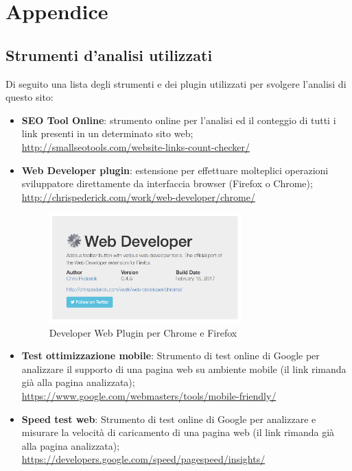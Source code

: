 \documentclass[../Relazione.tex]{subfiles}
\begin{document}
	
	\section{Appendice}

		\subsection{Strumenti d'analisi utilizzati}
		Di seguito una lista degli strumenti e dei plugin utilizzati per svolgere l'analisi di questo sito:

		\begin{itemize}
			\item \textbf{SEO Tool Online}: strumento online per l'analisi ed il conteggio di tutti i link presenti in un determinato sito web;\\
			\href{http://smallseotools.com/website-links-count-checker/}{http://smallseotools.com/website-links-count-checker/}
			\item \textbf{Web Developer plugin}: estensione per effettuare molteplici operazioni sviluppatore direttamente da interfaccia browser (Firefox o Chrome);\\
			\href{http://chrispederick.com/work/web-developer/chrome/}{http://chrispederick.com/work/web-developer/chrome/}\\
			\begin{figure}[!h]
				\centering
				\includegraphics[width=0.70\textwidth]{img/sito/webDeveloper.png}
				\caption{Developer Web Plugin per Chrome e Firefox }
				\label{fig:dwp}
			\end{figure}
			\item \textbf{Test ottimizzazione mobile}: Strumento di test online di Google per analizzare il supporto di una pagina web su ambiente mobile (il link rimanda già alla pagina analizzata);\\
			\href{https://search.google.com/test/mobile-friendly?url=http%3A%2F%2Fwww.lagunapaintball.it%2F}{https://www.google.com/webmasters/tools/mobile-friendly/}
			\item \textbf{Speed test web}: Strumento di test online di Google per analizzare e misurare la velocità di caricamento di una pagina web (il link rimanda già alla pagina analizzata);\\
			\href{https://developers.google.com/speed/pagespeed/insights/?url=http%3A%2F%2Fwww.lagunapaintball.it%2F&tab=mobile}{https://developers.google.com/speed/pagespeed/insights/}
		\end{itemize}
\end{document}
